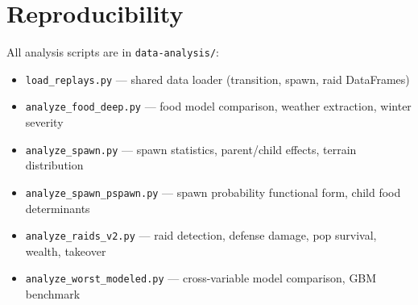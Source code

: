 \documentclass[11pt,a4paper]{article}
\begin{document}
\section*{Reproducibility}
All analysis scripts are in \texttt{data-analysis/}:
\begin{itemize}
\item \texttt{load\_replays.py} --- shared data loader (transition, spawn, raid DataFrames)
\item \texttt{analyze\_food\_deep.py} --- food model comparison, weather extraction, winter severity
\item \texttt{analyze\_spawn.py} --- spawn statistics, parent/child effects, terrain distribution
\item \texttt{analyze\_spawn\_pspawn.py} --- spawn probability functional form, child food determinants
\item \texttt{analyze\_raids\_v2.py} --- raid detection, defense damage, pop survival, wealth, takeover
\item \texttt{analyze\_worst\_modeled.py} --- cross-variable model comparison, GBM benchmark
\end{itemize}
\end{document}
